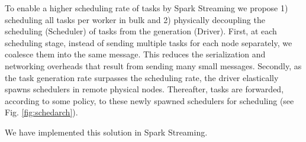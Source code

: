 To enable a higher scheduling rate of tasks by Spark Streaming we propose 1) scheduling all tasks per worker in bulk and 2) physically decoupling the scheduling (Scheduler) of tasks from the generation (Driver).
First, at each scheduling stage, instead of sending multiple tasks for each node separately, we coalesce them into the same message. This reduces the serialization and networking overheads that result from sending many small messages.
Secondly, as the task generation rate surpasses the scheduling rate, the driver elastically spawns schedulers in remote physical nodes. Thereafter, tasks are forwarded, according to some policy, to these newly spawned schedulers for scheduling (see Fig. \ref{fig:schedarch}). 

We have implemented this solution in Spark Streaming.
